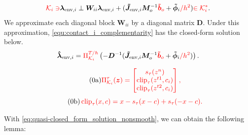 \begin{equation}
\textcolor{red}{\mathcal{K}_i\ni} \boldsymbol{\lambda}_{\text{env},i} \perp \boldsymbol{W}_{ii} \boldsymbol{\lambda}_{\text{env},i} + (\boldsymbol{\tilde{J}}_{\text{env},i} \boldsymbol{M}_o^{-1}\textcolor{red}{\boldsymbol{\tilde{b}}_o} + \boldsymbol{\tilde{\phi}}_i\textcolor{red}{/h^2}) \textcolor{red}{\in\mathcal{K}_i^{*}}.
\label{equ:contact_i_complementarity}
\end{equation}
\noindent We approximate each diagonal block $\boldsymbol{W}_{ii}$ by a diagonal matrix $\boldsymbol{D}$.  Under this approximation, \eqref{equ:contact_i_complementarity} has the  closed-form solution below.
\begin{equation}
\boldsymbol{\hat{\lambda}}_{\text{env}, i}
=
\textcolor{red}{\Pi^{T/h}_{\mathcal{K}_i}}
\left(
-
\boldsymbol{D}^{-1}
(\boldsymbol{\tilde{J}}_{\text{env},i} \boldsymbol{M}_o^{-1}\textcolor{red}{\boldsymbol{\tilde{b}}_o} + \boldsymbol{\tilde{\phi}}_i\textcolor{red}{/h^2})
\right).
\label{eq:quasi-closed_form_solution_nonsmooth}
\end{equation}
\noindent{}
\par\noindent\begin{minipage}{\columnwidth}
\begin{equation*}
\tag{\theequation a}\label{eq:scm_smooth_projection}
\color{red}
\Pi^\tau_{\mathcal K_i}(\boldsymbol z)
=\begin{bmatrix}
s_\tau(z^n)\\
\operatorname{clip}_\tau(z^{t1},c_i)\\
\operatorname{clip}_\tau(z^{t2},c_i)
\end{bmatrix},
\end{equation*}
\noindent{}
\begin{equation*}
\tag{\theequation b}\label{eq:scm_smooth_clip}
\color{red}
\operatorname{clip}_\tau(x,c)
=x-s_\tau(x-c)+s_\tau(-x-c).
\end{equation*}
\end{minipage}\par\noindent
With \eqref{eq:quasi-closed_form_solution_nonsmooth}, we can obtain the following lemma:
